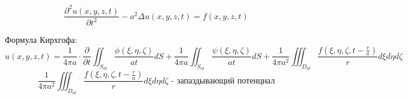 \documentclass[a4paper]{article}
\begin{document}
\[
    \frac{\partial^2 u(x,y,z,t)}{\partial t^2} - a^2 \Delta u(x,y,z,t) = f(x,y,z,t)
\]

Формула Кирхгофа:
\[
    u(x,y,z,t) = \frac{1}{4 \pi a} \cdot \frac{\partial }{\partial t} 
    \iint_{S_{at}} \frac{\phi(\xi, \eta, \zeta)}{at} dS + \frac{1}{4 \pi a} 
    \iint_{S_{at}} \frac{\psi(\xi, \eta, \zeta)}{at} dS
    + \frac{1}{4 \pi a^2} \iiint_{D_{at}} \frac{f(\xi, \eta, \zeta, t - \frac{r}{a}) }
    {r} d\xi d\eta d\zeta 
\]
\[
    \frac{1}{4 \pi a^2} \iiint_{D_{at}} \frac{f(\xi, \eta, \zeta, t - \frac{r}{a}) }
    {r} d\xi d\eta d\zeta \text{ - запаздывающий потенциал}
\]
\end{document}

